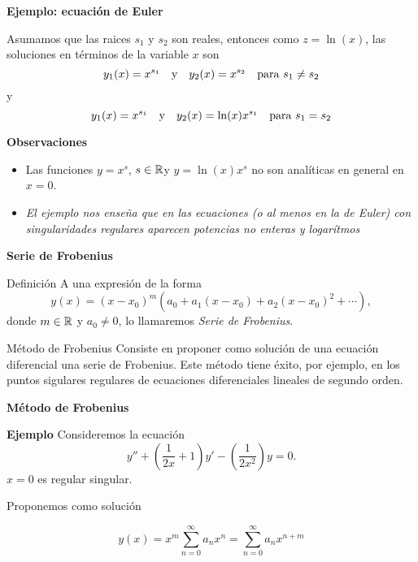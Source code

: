 \begin{frame}[fragile]{\textbf{Ejemplo: ecuación de Euler}}

Asumamos que las raices $s_1$ y $s_2$ son reales, entonces como $z=\ln(x)$, las soluciones en términos de la variable $x$ son
\[y_1(x)=x^{s_1}\quad\hbox{y}\quad y_2(x)=x^{s_2}\quad\text{para }  s_1\neq s_2\]
y
\[y_1(x)=x^{s_1} \quad\hbox{y}\quad y_2(x)=\ln(x)x^{s_1}\quad\text{para }  s_1= s_2\]

\textbf{Observaciones  } 

\begin{itemize}
 \item Las funciones $y=x^s$, $s\in \mathbb{R}$y $y=\ln(x)x^s$ no son analíticas en general en $x=0$.
 
 \item \emph{El ejemplo nos enseña que en las ecuaciones (o al menos en la de Euler) con singularidades regulares aparecen potencias no enteras y logarítmos}
\end{itemize}


\end{frame}







\begin{frame}[fragile]{\textbf{Serie de Frobenius}}

\begin{block}{Definición} A una expresión de la forma
 \[y(x)=(x-x_0)^m(a_0+a_1(x-x_0)+a_2(x-x_0)^2+\cdots),\]
donde $m\in\mathbb{R}$ y $a_0\neq 0$, lo llamaremos \emph{Serie de Frobenius}.
\end{block}

\begin{block}{Método de Frobenius}
  Consiste en proponer como solución de una ecuación diferencial una serie de Frobenius. Este método tiene éxito, por ejemplo, en los puntos sigulares regulares de ecuaciones diferenciales lineales de segundo orden.

\end{block}


\end{frame}







\begin{frame}[fragile]{\textbf{Método de Frobenius}}


\textbf{Ejemplo }  Consideremos la ecuación
\begin{equation}\label{eq:ejem_sim}y''+\left(\frac{1}{2x}+1\right)y'-\left(\frac{1}{2x^2}\right)y=0.
\end{equation}
$x=0$ es regular singular. 


Proponemos como solución

 \[y(x)=x^m\sum_{n=0}^{\infty}a_{n}x^n=\sum_{n=0}^{\infty}a_{n}x^{n+m}\]

\end{frame}







